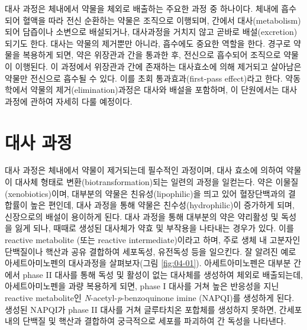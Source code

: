 \documentclass[
  11pt,
  krantz2, a4paper, twoside]{krantz}
\begin{document}
대사 과정은 체내에서 약물을 체외로 배출하는 주요한 과정 중 하나이다. 체내에 흡수되어 혈액을 따라 전신 순환하는 약물은 조직으로 이행되며, 간에서 대사(metabolism)되어 담즙이나 소변으로 배설되거나, 대사과정을 거치지 않고 곧바로 배설(excretion)되기도 한다. 대사는 약물의 제거뿐만 아니라, 흡수에도 중요한 역할을 한다. 경구로 약물을 복용하게 되면, 약은 위장관과 간을 통과한 후, 전신으로 흡수되어 조직으로 약물이 이행된다. 이 과정에서 위장관과 간에 존재하는 대사효소에 의해 제거되고 살아남은 약물만 전신으로 흡수될 수 있다. 이를 초회 통과효과(first-pass effect)라고 한다. 약동학에서 약물의 제거(elimination)과정은 대사와 배설을 포함하며, 이 단원에서는 대사 과정에 관하여 자세히 다룰 예정이다.

\section{대사 과정}\label{uxb300uxc0ac-uxacfcuxc815}

대사 과정은 체내에서 약물이 제거되는데 필수적인 과정이며, 대사 효소에 의하여 약물이 대사체 형태로 변환(biotransformation)되는 일련의 과정을 일컫는다. 약은 이물질(xenobiotics)이며, 대부분의 약물은 친유성(lipophilic)을 띄고 있어 혈장단백과의 결합률이 높은 편인데, 대사 과정을 통해 약물은 친수성(hydrophilic)이 증가하게 되며, 신장으로의 배설이 용이하게 된다. 대사 과정을 통해 대부분의 약은 약리활성 및 독성을 잃게 되나, 때때로 생성된 대사체가 약효 및 부작용을 나타내는 경우가 있다. 이를 reactive metabolite (또는 reactive intermediate)이라고 하며, 주로 생체 내 고분자인 단백질이나 핵산과 공유 결합하여 세포독성, 유전독성 등을 일으킨다. 잘 알려진 예로 아세트아미노펜의 대사과정을 살펴보자(그림 \ref{fig:04-01}). 아세트아미노펜은 대부분 간에서 phase II 대사를 통해 독성 및 활성이 없는 대사체를 생성하여 체외로 배출되는데, 아세트아미노펜을 과량 복용하게 되면, phase I 대사를 거쳐 높은 반응성을 지닌 reactive metabolite인 \emph{N}-acetyl-\emph{p}-benzoquinone imine (NAPQI)를 생성하게 된다. 생성된 NAPQI가 phase II 대사를 거쳐 글루타치온 포합체를 생성하지 못하면, 간세포 내의 단백질 및 핵산과 결합하여 궁극적으로 세포를 파괴하여 간 독성을 나타낸다.
\end{document}

